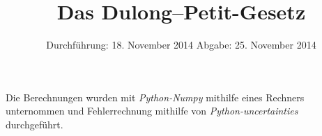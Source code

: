 
\subject{Anfängerpraktikum V201}
\title{Das Dulong--Petit-Gesetz}
\date{
  Durchführung: 18. November 2014
  \hspace{1em}
  Abgabe: 25. November 2014
}


\maketitle
\thispagestyle{empty}
\newpage





\printbibliography
Die Berechnungen wurden mit \textit{Python-Numpy} mithilfe eines Rechners unternommen 
und Fehlerrechnung mithilfe von \textit{Python-uncertainties}\cite{uncertainties} durchgeführt.

